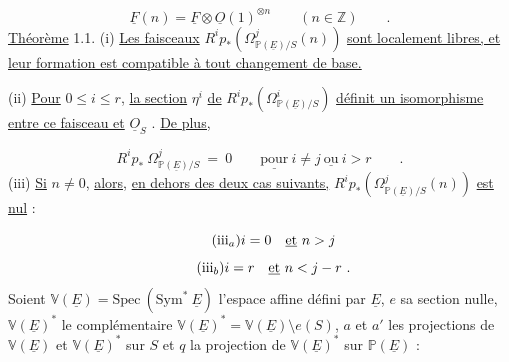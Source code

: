\begin{equation*}
\underline{F}(n) = \underline{F} \otimes \underline{O}(1)^{\otimes n} \qquad (n \in \mathbb{Z}) \qquad .
\end{equation*}
\underline{Th\'eor\`eme} 1.1. \quad (i) \underline{Les faisceaux} $R^i p_*(\Omega^j_{\mathbb{P}(\underline{E})/S}(n))$ \underline{sont localement libres, et leur formation est compatible \`a tout changement de base.}

(ii) \underline{Pour} $0 \leq i \leq r$, \underline{la section} $\eta^i$ \underline{de} $R^i p_*(\Omega^i_{\mathbb{P}(\underline{E})/S})$ \underline{d\'efinit un isomorphisme entre ce faisceau et} $\underline{O}_S$ . \underline{De plus,}

\begin{equation*}
R^i p_* \ \Omega^j_{\mathbb{P}(\underline{E})/S} \ = \ 0 \qquad \underline{\mathrm{pour}}\ i \neq j \ \underline{\mathrm{ou}}\ i > r \qquad .
\end{equation*}
(iii) \underline{Si} $n \neq 0$, \underline{alors,} \underline{en dehors des deux cas suivants,} $R^i p_*(\Omega^j_{\mathbb{P}(\underline{E})/S}(n))$ \underline{est nul} :

\begin{equation}\tag{iii$_{a}$}
i = 0 \quad \underline{\mathrm{et}}\ n > j
\end{equation}
\begin{equation}\tag{iii$_{b}$}
i = r \quad \underline{\mathrm{et}}\ n < j-r \ .
\end{equation}
Soient $\mathbb{V}(\underline{E}) = \mathrm{Spec}\ (\mathrm{Sym}^*\ \underline{E})$ l'espace affine d\'efini par $\underline{E}$, $e$ sa section nulle, $\mathbb{V}(\underline{E})^*$ le compl\'ementaire $\mathbb{V}(\underline{E})^* = \mathbb{V}(\underline{E}) \setminus e(S)$, $a$ et $a'$ les projections de $\mathbb{V}(\underline{E})$ et $\mathbb{V}(\underline{E})^*$ sur $S$ et $q$ la projection de $\mathbb{V}(\underline{E})^*$ sur $\mathbb{P}(\underline{E})$ :

